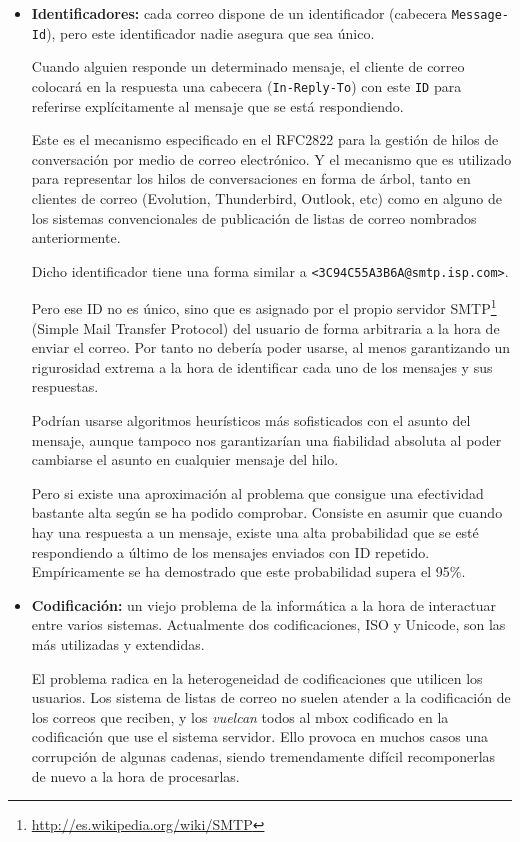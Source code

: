 \begin{itemize}

  \item \textbf{Identificadores:} cada correo dispone de un identificador 
	(cabecera \texttt{Message-Id}), pero este identificador nadie 
	asegura que sea único.

	Cuando alguien responde un determinado mensaje, el cliente de correo 
	colocará en la respuesta una cabecera (\texttt{In-Reply-To}) con este 
	\texttt{ID} para referirse explícitamente al mensaje que se está 
	respondiendo.

	Este es el mecanismo especificado en el RFC2822\cite{Resnick2001} para 
	la gestión de hilos de conversación por medio de correo electrónico. 
	Y el mecanismo que es utilizado para representar los hilos de 
	conversaciones en forma de árbol, tanto en clientes de correo (Evolution, 
	Thunderbird, Outlook, etc) como en alguno de los sistemas convencionales 
	de publicación de listas de correo nombrados anteriormente.

	Dicho identificador tiene una forma similar a 
	\texttt{<3C94C55A3B6A@smtp.isp.com>}.

	Pero ese ID no es único, sino que es asignado por el propio servidor
	SMTP\footnote{\url{http://es.wikipedia.org/wiki/SMTP}} (Simple Mail 
	Transfer Protocol) del usuario de forma arbitraria a la hora de enviar 
	el correo. Por tanto no debería poder usarse, al menos garantizando un 
	rigurosidad extrema a la hora de identificar cada uno de los mensajes 
	y sus respuestas.

	Podrían usarse algoritmos heurísticos más sofisticados con el asunto del 
	mensaje, aunque tampoco nos garantizarían una fiabilidad absoluta al 
	poder cambiarse el asunto en cualquier mensaje del hilo.

	Pero si existe una aproximación al problema que consigue una efectividad 
	bastante alta según se ha podido comprobar. Consiste en asumir que cuando 
	hay una respuesta a un mensaje, existe una alta probabilidad que se esté 
	respondiendo a último de los mensajes enviados con ID repetido. Empíricamente 
	se ha demostrado que este probabilidad supera el 95\%.

  \item \textbf{Codificación:} un viejo problema de la informática a la hora de 
	interactuar entre varios sistemas. Actualmente dos codificaciones, ISO 
	y Unicode, son las más utilizadas y extendidas.

	El problema radica en la heterogeneidad de codificaciones que utilicen 
	los usuarios. Los sistema de listas de correo no suelen atender a la 
	codificación de los correos que reciben, y los \emph{vuelcan} todos al 
	mbox codificado en la codificación que use el sistema servidor. Ello 
	provoca en muchos casos una corrupción de algunas cadenas, siendo 
	tremendamente difícil recomponerlas de nuevo a la hora de procesarlas.

\end{itemize}

